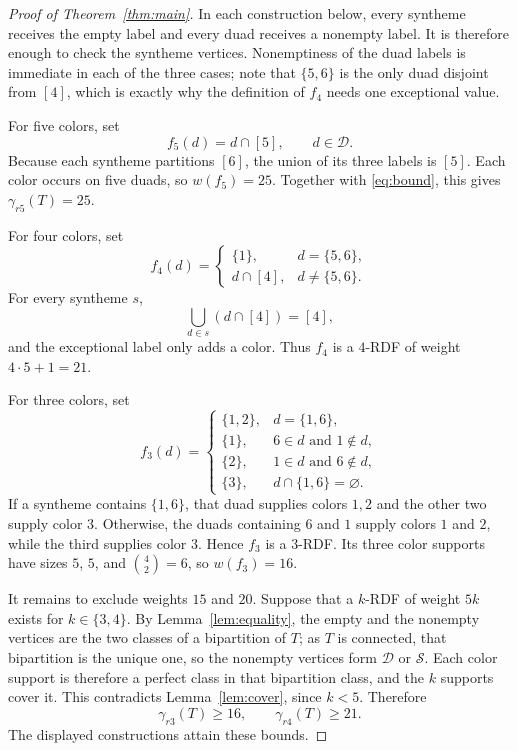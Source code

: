 \documentclass[11pt]{amsart}
\begin{document}
\begin{proof}[Proof of Theorem~\ref{thm:main}]
In each construction below, every syntheme receives the empty label and
every duad receives a nonempty label. It is therefore enough to check
the syntheme vertices. Nonemptiness of the duad labels is immediate in
each of the three cases; note that $\{5,6\}$ is the only duad disjoint
from $[4]$, which is exactly why the definition of $f_4$ needs one
exceptional value.

For five colors, set
\[
  f_5(d)=d\cap[5],\qquad d\in\mathcal D.
\]
Because each syntheme partitions $[6]$, the union of its three labels
is $[5]$. Each color occurs on five duads, so $w(f_5)=25$. Together
with \eqref{eq:bound}, this gives $\gamma_{r5}(T)=25$.

For four colors, set
\[
  f_4(d)=
  \begin{cases}
    \{1\},&d=\{5,6\},\\
    d\cap[4],&d\neq\{5,6\}.
  \end{cases}
\]
For every syntheme $s$,
\[
  \bigcup_{d\in s}(d\cap[4])=[4],
\]
and the exceptional label only adds a color. Thus $f_4$ is a $4$-RDF
of weight $4\cdot5+1=21$.

For three colors, set
\[
  f_3(d)=
  \begin{cases}
    \{1,2\},&d=\{1,6\},\\
    \{1\},&6\in d\text{ and }1\notin d,\\
    \{2\},&1\in d\text{ and }6\notin d,\\
    \{3\},&d\cap\{1,6\}=\varnothing.
  \end{cases}
\]
If a syntheme contains $\{1,6\}$, that duad supplies colors $1,2$ and
the other two supply color $3$. Otherwise, the duads containing $6$
and $1$ supply colors $1$ and $2$, while the third supplies color $3$.
Hence $f_3$ is a $3$-RDF. Its three color supports have sizes $5$, $5$,
and $\binom42=6$, so $w(f_3)=16$.

It remains to exclude weights $15$ and $20$. Suppose that a $k$-RDF
of weight $5k$ exists for $k\in\{3,4\}$. By Lemma~\ref{lem:equality},
the empty and the nonempty vertices are the two classes of a bipartition
of $T$; as $T$ is connected, that bipartition is the unique one, so the
nonempty vertices form $\mathcal D$ or $\mathcal S$. Each color support
is therefore a perfect class in that bipartition class, and the $k$
supports cover it. This contradicts
Lemma~\ref{lem:cover}, since $k<5$. Therefore
\[
  \gamma_{r3}(T)\geq16,
  \qquad
  \gamma_{r4}(T)\geq21.
\]
The displayed constructions attain these bounds.
\end{proof}
\end{document}
